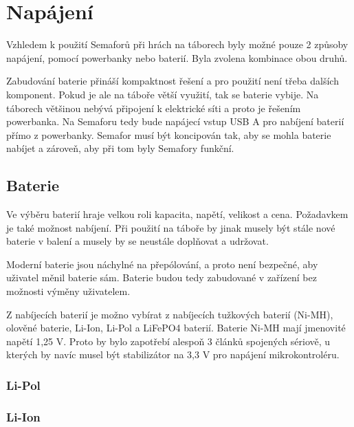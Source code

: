 \section{Napájení}
Vzhledem k použití Semaforů při hrách na táborech byly možné pouze 2 způsoby napájení, pomocí powerbanky nebo baterií. Byla zvolena kombinace obou druhů.

Zabudování baterie přináší kompaktnost řešení a pro použití není třeba dalších komponent. Pokud je ale na táboře větší využití, tak se baterie vybije.
Na táborech většinou nebývá připojení k elektrické síti a proto je řešením powerbanka. Na Semaforu tedy bude napájecí vstup USB A pro nabíjení baterií
přímo z powerbanky. Semafor musí být koncipován tak, aby se mohla baterie nabíjet a zároveň, aby při tom byly Semafory funkční.

\subsection{Baterie}
Ve výběru baterií hraje velkou roli kapacita, napětí, velikost a cena. Požadavkem je také možnost nabíjení. Při použití na táboře by jinak musely být stále 
nové baterie v balení a musely by se neustále doplňovat a udržovat.

Moderní baterie jsou náchylné na přepólování, a proto není bezpečné, aby uživatel měnil baterie sám. Baterie budou tedy zabudované v zařízení bez možnosti 
výměny uživatelem. 


Z nabíjecích baterií je možno vybírat z nabíjecích tužkových baterií (Ni-MH), olověné baterie, Li-Ion, Li-Pol a LiFePO4 baterií.
Baterie Ni-MH mají jmenovité napětí 1,25 V. %
Proto by bylo zapotřebí alespoň 3 článků spojených sériově, u kterých by navíc musel být stabilizátor
na 3,3 V pro napájení mikrokontroléru. %

\subsubsection{Li-Pol}


\subsubsection{Li-Ion}



